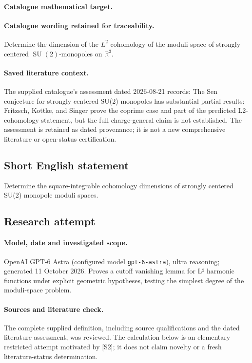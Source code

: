 \documentclass[11pt]{article}
\begin{document}
\paragraph{Catalogue mathematical target.}
\paragraph{Catalogue wording retained for traceability.}
Determine the dimension of the $L^2$-cohomology of the moduli space of strongly centered $\operatorname{SU}(2)$-monopoles on $\mathbb R^3$.

\paragraph{Saved literature context.} The supplied catalogue's assessment dated 2026-08-21 records: The Sen conjecture for strongly centered SU(2) monopoles has substantial partial results: Fritzsch, Kottke, and Singer prove the coprime case and part of the predicted L2-cohomology statement, but the full charge-general claim is not established. The assessment is retained as dated provenance; it is not a new comprehensive literature or open-status certification.
\subsection{Short English statement}
Determine the square-integrable cohomology dimensions of strongly centered SU(2) monopole moduli spaces.
\subsection{Research attempt}
\paragraph{Model, date and investigated scope.}
OpenAI GPT-6 Astra (configured model \texttt{gpt-6-astra}), ultra reasoning; generated 11 October 2026. Proves a cutoff vanishing lemma for L² harmonic functions under explicit geometric hypotheses, testing the simplest degree of the moduli-space problem.

\paragraph{Sources and literature check.}
The complete supplied definition, including source qualifications and the dated literature assessment, was reviewed. The calculation below is an elementary restricted attempt motivated by [S2]; it does not claim novelty or a fresh literature-status determination.
\end{document}
